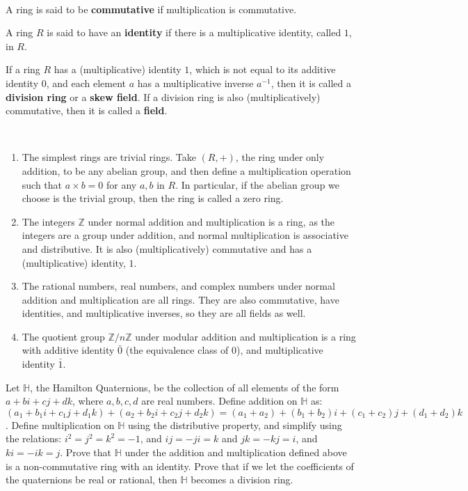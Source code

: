 \documentclass{article}
\begin{document}
\begin{definition}
\


A ring is said to be \textbf{commutative} if multiplication is commutative.

A ring $R$ is said to have an \textbf{identity} if there is a multiplicative identity, called $1$, in $R$.
\end{definition}

\begin{definition}
If a ring $R$ has a (multiplicative) identity $1$, which is not equal to its additive identity $0$, and each element $a$ has a multiplicative inverse $a ^{-1}$, then it is called a \textbf{division ring} or a \textbf{skew field}. If a division ring is also (multiplicatively) commutative, then it is called a \textbf{field}. 
\end{definition}

\begin{example}
    \
\begin{enumerate}
    \item The simplest rings are trivial rings. Take $(R,+)$, the ring under only addition, to be any abelian group, and then define a multiplication operation such that $a\times b = 0$ for any $a,b$ in $R$. In particular, if the abelian group we choose is the trivial group, then the ring is called a zero ring. 
    \item The integers $\mathbb{Z}$ under normal addition and multiplication is a ring, as the integers are a group under addition, and normal multiplication is associative and distributive. It is also (multiplicatively) commutative and has a (multiplicative) identity, $1$.
    \item The rational numbers, real numbers, and complex numbers under normal addition and multiplication are all rings. They are also commutative, have identities, and multiplicative inverses, so they are all fields as well.
    \item The quotient group $\mathbb{Z}/n\mathbb{Z}$ under modular addition and multiplication is a ring with additive identity $\bar{0}$ (the equivalence class of $0$), and multiplicative identity $\bar{1}$. 
\end{enumerate}
\end{example}

\begin{theorem}
Let $\mathbb{H}$, the Hamilton Quaternions, be the collection of all elements of the form $a+bi+cj+dk$, where $a,b,c,d$ are real numbers. Define addition on $\mathbb{H}$ as: $(a_1+b_1i+c_1j+d_1k) + (a_2 + b_2i + c_2j + d_2k) = (a_1+a_2) + (b_1+b_2)i + (c_1+c_2)j + (d_1+d_2)k$. Define multiplication on $\mathbb{H}$ using the distributive property, and simplify using the relations: $i^2 = j^2 = k^2 = -1$, and $ij = -ji = k$ and $jk = -kj = i$, and $ki = -ik = j$. Prove that $\mathbb{H}$ under the addition and multiplication defined above is a non-commutative ring with an identity. Prove that if we let the coefficients of the quaternions be real or rational, then $\mathbb{H}$ becomes a division ring.
\end{theorem}
\end{document}
